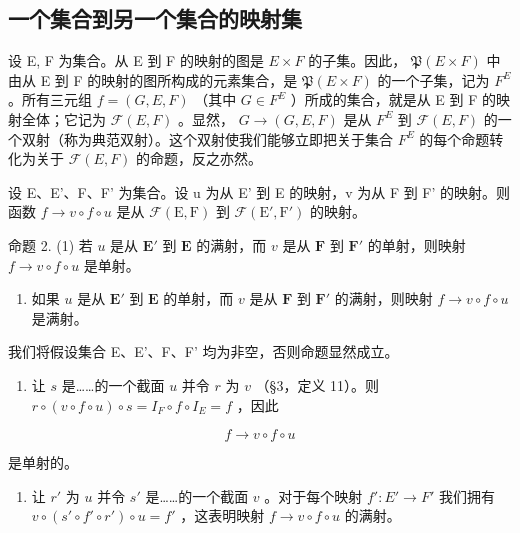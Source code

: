 \subsection{一个集合到另一个集合的映射集}

设 E, F 为集合。从 E 到 F 的映射的图是 \(E \times F\) 的子集。因此， \(\mathfrak{P}(E \times F)\) 中由从 E 到 F 的映射的图所构成的元素集合，是 \(\mathfrak{P}(E \times F)\) 的一个子集，记为 \(F^{E}\) 。所有三元组 \(f = (G, E, F)\) （其中 \(G \in F^{E}\) ）所成的集合，就是从 E 到 F 的映射全体；它记为 \(\mathcal{F}(E, F)\) 。显然， \(G \to (G, E, F)\) 是从 \(F^{E}\) 到 \(\mathcal{F}(E, F)\) 的一个双射（称为典范双射）。这个双射使我们能够立即把关于集合 \(F^{E}\) 的每个命题转化为关于 \(\mathcal{F}(E, F)\) 的命题，反之亦然。

设 E、E'、F、F' 为集合。设 u 为从 E' 到 E 的映射，v 为从 F 到 F' 的映射。则函数 \(f \rightarrow v \circ f \circ u\) 是从 \(\mathcal{F}(\mathrm{E}, \mathrm{F})\) 到 \(\mathcal{F}(\mathrm{E}', \mathrm{F}')\) 的映射。

命题 2. (1) 若 \(u\) 是从 \(\mathbf{E}'\) 到 \(\mathbf{E}\) 的满射，而 \(v\) 是从 \(\mathbf{F}\) 到 \(\mathbf{F}'\) 的单射，则映射 \(f \to v \circ f \circ u\) 是单射。

\begin{enumerate}
\def\labelenumi{(\arabic{enumi})}
\setcounter{enumi}{1}
\tightlist
\item
  如果 \(u\) 是从 \(\mathbf{E}'\) 到 \(\mathbf{E}\) 的单射，而 \(v\) 是从 \(\mathbf{F}\) 到 \(\mathbf{F}'\) 的满射，则映射 \(f \to v \circ f \circ u\) 是满射。
\end{enumerate}

我们将假设集合 E、E'、F、F' 均为非空，否则命题显然成立。

\begin{enumerate}
\def\labelenumi{(\arabic{enumi})}
\tightlist
\item
  让 \(s\) 是……的一个截面 \(u\) 并令 \(r\) 为 \(v\) （§3，定义 11）。则 \(r \circ (v \circ f \circ u) \circ s = I_F \circ f \circ I_E = f\) ，因此
\end{enumerate}

\[
f \rightarrow v \circ f \circ u
\]

是单射的。

\begin{enumerate}
\def\labelenumi{(\arabic{enumi})}
\setcounter{enumi}{1}
\tightlist
\item
  让 \(r'\) 为 \(u\) 并令 \(s'\) 是……的一个截面 \(v\) 。对于每个映射 \(f': E' \to F'\) 我们拥有 \(v \circ (s' \circ f' \circ r') \circ u = f'\) ，这表明映射 \(f \to v \circ f \circ u\) 的满射。
\end{enumerate}

